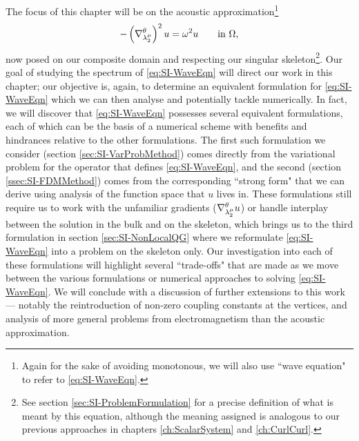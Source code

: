 The focus of this chapter will be on the acoustic approximation\footnote{Again for the sake of avoiding monotonous, we will also use ``wave equation" to refer to \eqref{eq:SI-WaveEqn}.}
\begin{align} \label{eq:SI-WaveEqn}
	-\left( \nabla^{\theta}_{\lambda_2^{\mu}} \right)^2 u = \omega^2 u \qquad\text{in } \Omega,
\end{align}
now posed on our composite domain and respecting our singular skeleton\footnote{See section \ref{sec:SI-ProblemFormulation} for a precise definition of what is meant by this equation, although the meaning assigned is analogous to our previous approaches in chapters \ref{ch:ScalarSystem} and \ref{ch:CurlCurl}.}.
Our goal of studying the spectrum of \eqref{eq:SI-WaveEqn} will direct our work in this chapter; our objective is, again, to determine an equivalent formulation for \eqref{eq:SI-WaveEqn} which we can then analyse and potentially tackle numerically.
In fact, we will discover that \eqref{eq:SI-WaveEqn} possesses several equivalent formulations, each of which can be the basis of a numerical scheme with benefits and hindrances relative to the other formulations.
The first such formulation we consider (section \ref{sec:SI-VarProbMethod}) comes directly from the variational problem for the operator that defines \eqref{eq:SI-WaveEqn}, and the second (section \ref{ssec:SI-FDMMethod}) comes from the corresponding ``strong form" that we can derive using analysis of the function space that $u$ lives in.
These formulations still require us to work with the unfamiliar gradients ($\nabla^{\theta}_{\lambda_2^{\mu}}u$) or handle interplay between the solution in the bulk and on the skeleton, which brings us to the third formulation in section \ref{sec:SI-NonLocalQG} where we reformulate \eqref{eq:SI-WaveEqn} into a problem on the skeleton only.
Our investigation into each of these formulations will highlight several ``trade-offs" that are made as we move between the various formulations or numerical approaches to solving \eqref{eq:SI-WaveEqn}.
We will conclude with a discussion of further extensions to this work --- notably the reintroduction of non-zero coupling constants at the vertices, and analysis of more general problems from electromagnetism than the acoustic approximation.
